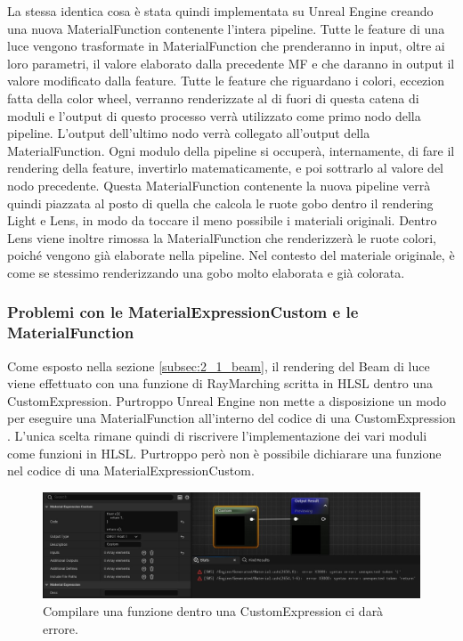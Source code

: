 \documentclass[main.tex]{subfiles}
\begin{document}
\noindent La stessa identica cosa è stata quindi implementata su Unreal Engine creando una nuova MaterialFunction contenente l'intera pipeline. Tutte le feature di una luce vengono trasformate in MaterialFunction che prenderanno in input, oltre ai loro parametri, il valore elaborato dalla precedente MF e che daranno in output il valore modificato dalla feature. Tutte le feature che riguardano i colori, eccezion fatta della color wheel, verranno renderizzate al di fuori di questa catena di moduli e l'output di questo processo verrà utilizzato come primo nodo della pipeline. L'output dell'ultimo nodo verrà collegato all'output della MaterialFunction. Ogni modulo della pipeline si occuperà, internamente, di fare il rendering della feature, invertirlo matematicamente, e poi sottrarlo al valore del nodo precedente. \newline
Questa MaterialFunction contenente la nuova pipeline verrà quindi piazzata al posto di quella che calcola le ruote gobo dentro il rendering Light e Lens, in modo da toccare il meno possibile i materiali originali. Dentro Lens viene inoltre rimossa la MaterialFunction che renderizzerà le ruote colori, poiché vengono già elaborate nella pipeline. Nel contesto del materiale originale, è come se stessimo renderizzando una gobo molto elaborata e già colorata. %

\subsubsection{Problemi con le MaterialExpressionCustom e le MaterialFunction}\label{subsec:2_2_CM-MFproblems}
Come esposto nella sezione \ref{subsec:2_1_beam}, il rendering del Beam di luce viene effettuato con una funzione di RayMarching scritta in HLSL dentro una CustomExpression. Purtroppo Unreal Engine non mette a disposizione un modo  per eseguire una MaterialFunction all'interno del codice di una CustomExpression \cite{customExpressionMaterialFunction}. L'unica scelta rimane quindi di riscrivere l'implementazione dei vari moduli come funzioni in HLSL. Purtroppo però non è possibile dichiarare una funzione nel codice di una MaterialExpressionCustom.
\begin{figure}[H]
    \centering
    \includegraphics[width=1\linewidth]{img/renderingPipeline/meCustomNoFunc.jpg}
    \caption{Compilare una funzione dentro una CustomExpression ci darà errore.}
    \label{fig:2_funcCompileError}
\end{figure}
\end{document}
